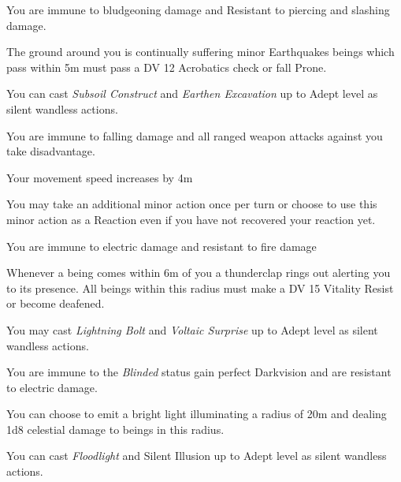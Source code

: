 \documentclass[a5paper,twocolumn, 10pt]{article}
\begin{document}
{{
{
\item You are immune to bludgeoning damage and Resistant to piercing and slashing damage.
\item The ground around you is continually suffering minor Earthquakes\comma{} beings which pass within 5m must pass a DV 12 Acrobatics check or fall Prone. 
\item You can cast {\it Subsoil Construct} and {\it Earthen Excavation} up to Adept level as silent\comma{} wandless actions. 
}

{
\item You are immune to falling damage and all ranged weapon attacks against you take disadvantage. 
\item Your movement speed increases by 4m 
\item You may take an additional minor action once per turn\comma{} or choose to use this minor action as a Reaction even if you have not recovered your reaction yet. 
}

{
\item You are immune to electric damage and resistant to fire damage
\item Whenever a being comes within 6m of you\comma{} a thunderclap rings out\comma{} alerting you to its presence. All beings within this radius must make a DV 15 Vitality Resist\comma{} or become deafened. 
\item You may cast {\it Lightning Bolt} and {\it Voltaic Surprise} up to Adept level as silent\comma{} wandless actions. 
}

{
\item You are immune to the {\it Blinded} status\comma{} gain perfect Darkvision and are resistant to electric damage. 
\item You can choose to emit a bright light\comma{} illuminating a radius of 20m and dealing 1d8 celestial damage to beings in this radius. 
\item You can cast {\it Floodlight} and {Silent Illusion} up to Adept level as silent\comma{} wandless actions. 
}
}
}
\end{document}

